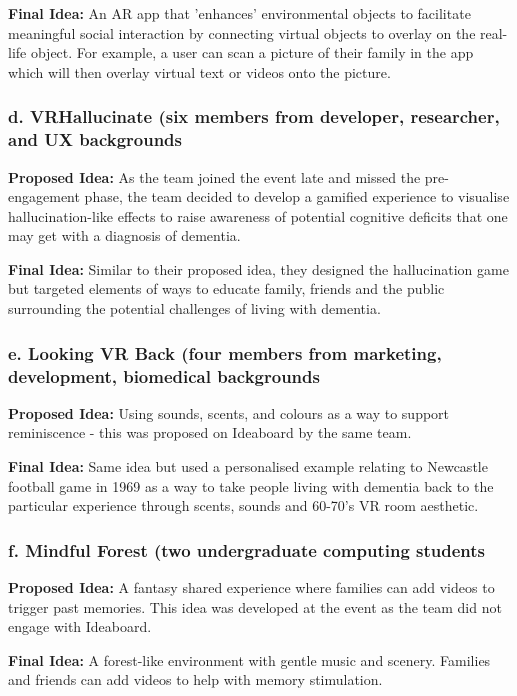 \textbf{Final Idea:} An AR app that 'enhances' environmental objects to facilitate meaningful social interaction by connecting virtual objects to overlay on the real-life object. For example, a user can scan a picture of their family in the app which will then overlay virtual text or videos onto the picture.

\subsubsection{d. VRHallucinate (six members from developer, researcher, and UX backgrounds}
\label{sec:VRHallucinate}
\textbf{Proposed Idea:} As the team joined the event late and missed the pre-engagement phase, the team decided to develop a gamified experience to visualise hallucination-like effects to raise awareness of potential cognitive deficits that one may get with a diagnosis of dementia.

\textbf{Final Idea:} Similar to their proposed idea, they designed the hallucination game but targeted elements of ways to educate family, friends and the public surrounding the potential challenges of living with dementia.

\subsubsection{e. Looking VR Back (four members from marketing, development, biomedical backgrounds}
\label{sec:VRBack}

\textbf{Proposed Idea:} Using sounds, scents, and colours as a way to support reminiscence - this was proposed on Ideaboard by the same team.

\textbf{Final Idea:} Same idea but used a personalised example relating to Newcastle football game in 1969 as a way to take people living with dementia back to the particular experience through scents, sounds and 60-70's VR room aesthetic. 

\subsubsection{f. Mindful Forest (two undergraduate computing students}
\label{sec:mindfulForest}

\textbf{Proposed Idea:} A fantasy shared experience where families can add videos to trigger past memories. This idea was developed at the event as the team did not engage with Ideaboard.

\textbf{Final Idea:} A forest-like environment with gentle music and scenery. Families and friends can add videos to help with memory stimulation.

